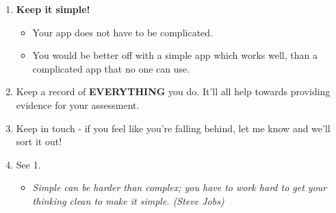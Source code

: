 \documentclass[10pt]{article}
\begin{document}
	\begin{enumerate}
		\item \textbf{Keep it simple!} 
		\begin{itemize}
			\item Your app does not have to be complicated. 
			\item You would be better off with a simple app which works well, than a complicated app that no one can use.
		\end{itemize}
		\item Keep a record of \textbf{EVERYTHING} you do. It'll all help towards providing evidence for your assessment.
		\item Keep in touch - if you feel like you're falling behind, let me know and we'll sort it out!
		\item See 1.  
		\begin{itemize}
			\item \textit{Simple can be harder than complex; you have to work hard to get your thinking clean to make it simple. (Steve Jobs)}
		\end{itemize}
	\end{enumerate}
	
\end{document}
